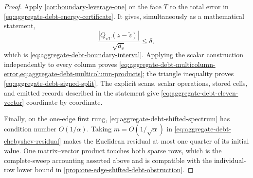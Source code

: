 \begin{proof}
Apply \cref{cor:boundary-leverage-one} on the face $T$ to the total error in
\cref{eq:aggregate-debt-energy-certificate}.  It gives, simultaneously as a
mathematical statement,
\begin{equation*}
 \frac{|Q_{vT}(z-\widetilde z)|}{\sqrt{d_v}}
 \leq\delta,
\end{equation*}
which is \cref{eq:aggregate-debt-boundary-interval}.  Applying the scalar
construction independently to every column proves
\cref{eq:aggregate-debt-multicolumn-error,eq:aggregate-debt-multicolumn-products};
the triangle inequality proves \cref{eq:aggregate-debt-signed-split}.  The
explicit scans, scalar operations, stored cells, and emitted records described
in the statement give \cref{eq:aggregate-debt-eleven-vector} coordinate by
coordinate.

Finally, on the one-edge first rung,
\cref{eq:aggregate-debt-shifted-spectrum} has condition number
$O(1/\alpha)$.  Taking $m=O(1/\sqrt\alpha)$ in
\cref{eq:aggregate-debt-chebyshev-residual} makes the Euclidean residual at
most one quarter of its initial value.  One matrix--vector product touches
both sparse rows, which is the complete-sweep accounting asserted above and
is compatible with the individual-row lower bound in
\cref{prop:one-edge-shifted-debt-obstruction}.
\end{proof}

